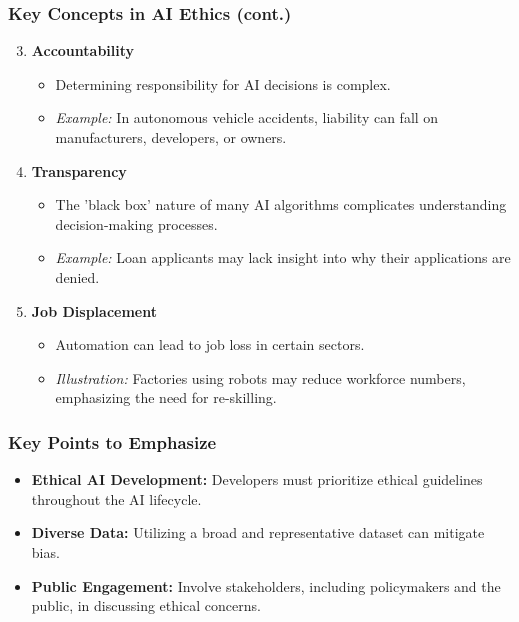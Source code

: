 \documentclass[aspectratio=169]{beamer}
\begin{document}
\begin{frame}[fragile]
    \frametitle{Key Concepts in AI Ethics (cont.)}
    \begin{enumerate}
        \setcounter{enumi}{2} %
        \item \textbf{Accountability}
        \begin{itemize}
            \item Determining responsibility for AI decisions is complex.
            \item \textit{Example:} In autonomous vehicle accidents, liability can fall on manufacturers, developers, or owners.
        \end{itemize}
        
        \item \textbf{Transparency}
        \begin{itemize}
            \item The 'black box' nature of many AI algorithms complicates understanding decision-making processes.
            \item \textit{Example:} Loan applicants may lack insight into why their applications are denied.
        \end{itemize}
        
        \item \textbf{Job Displacement}
        \begin{itemize}
            \item Automation can lead to job loss in certain sectors.
            \item \textit{Illustration:} Factories using robots may reduce workforce numbers, emphasizing the need for re-skilling.
        \end{itemize}
    \end{enumerate}
\end{frame}

\begin{frame}[fragile]
    \frametitle{Key Points to Emphasize}
    \begin{itemize}
        \item \textbf{Ethical AI Development:} Developers must prioritize ethical guidelines throughout the AI lifecycle.
        \item \textbf{Diverse Data:} Utilizing a broad and representative dataset can mitigate bias.
        \item \textbf{Public Engagement:} Involve stakeholders, including policymakers and the public, in discussing ethical concerns.
    \end{itemize}
\end{frame}
\end{document}
